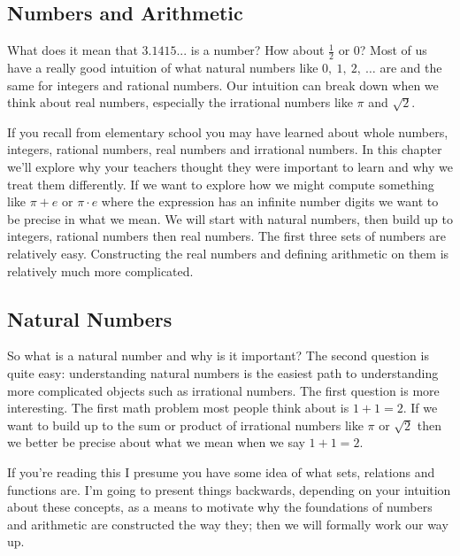 \documentclass[oneside]{book}
\begin{document}
\begin{spacing}{1.618}
\appendix
\chapter{Numbers and Arithmetic}\label{appendix:numbers_and_arithmetic}

What does it mean that $3.1415...$ is a number? How about $\frac{1}{2}$ or $0$? Most of us have a really good intuition of what natural numbers like $0,~1,~2,~\dots$ are and the same for integers and rational numbers. Our intuition can break down when we think about real numbers, especially the irrational numbers like $\pi$ and $\sqrt{2}$. 

If you recall from elementary school you may have learned about whole numbers, integers, rational numbers, real numbers and irrational numbers. In this chapter we'll explore why your teachers thought they were important to learn and why we treat them differently. If we want to explore how we might compute something like $\pi+e$ or $\pi\cdot e$ where the expression has an infinite number digits we want to be precise in what we mean. We will start with natural numbers, then build up to integers, rational numbers then real numbers. The first three sets of numbers are relatively easy. Constructing the real numbers and defining arithmetic on them is relatively much more complicated. 

\section{Natural Numbers}
So what is a natural number and why is it important? The second question is quite easy: understanding natural numbers is the easiest path to understanding more complicated objects such as irrational numbers. The first question is more interesting. The first math problem most people think about is $1+1=2$. If we want to build up to the sum or product of irrational numbers like $\pi$ or $\sqrt{2}$ then we better be precise about what we mean when we say $1+1=2$. 

If you're reading this I presume you have some idea of what sets, relations and functions are. I'm going to present things backwards, depending on your intuition about these concepts, as a means to motivate why the foundations of numbers and arithmetic are constructed the way they; then we will formally work our way up. 


\end{spacing}
\end{document}
